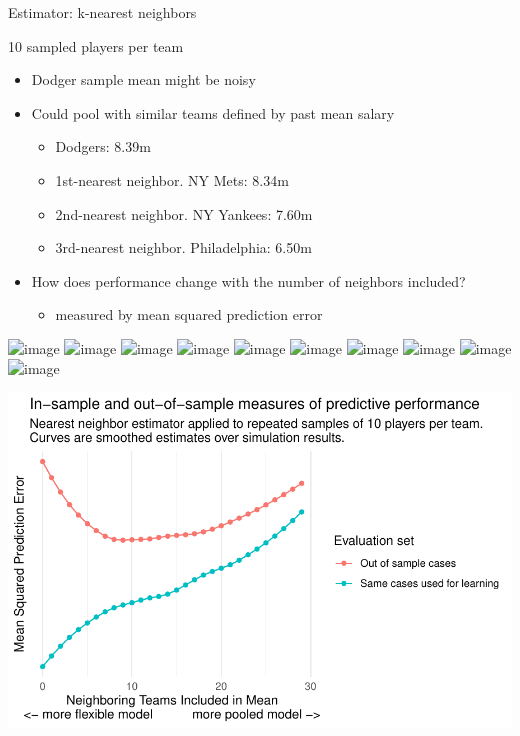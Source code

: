\documentclass{beamer}
\begin{document}
\begin{frame}{Estimator: k-nearest neighbors}

10 sampled players per team
\begin{itemize}
\item Dodger sample mean might be noisy
\item Could pool with similar teams defined by past mean salary
\begin{itemize}
\item Dodgers: 8.39m
\item 1st-nearest neighbor. NY Mets: 8.34m
\item 2nd-nearest neighbor. NY Yankees: 7.60m
\item 3rd-nearest neighbor. Philadelphia: 6.50m
\end{itemize}
\item How does performance change with the number of neighbors included?
\begin{itemize}
\item measured by mean squared prediction error
\end{itemize}
\end{itemize}

\end{frame}

\begin{frame}
\includegraphics<1>[width = \textwidth]{figures/knn_0}
\includegraphics<2>[width = \textwidth]{figures/knn_1}
\includegraphics<3>[width = \textwidth]{figures/knn_2}
\includegraphics<4>[width = \textwidth]{figures/knn_3}
\includegraphics<5>[width = \textwidth]{figures/knn_4}
\includegraphics<6>[width = \textwidth]{figures/knn_5}
\includegraphics<7>[width = \textwidth]{figures/knn_10}
\includegraphics<8>[width = \textwidth]{figures/knn_15}
\includegraphics<9>[width = \textwidth]{figures/knn_20}
\includegraphics<10>[width = \textwidth]{figures/knn_25}
\end{frame}

\begin{frame}
\includegraphics[width = \textwidth]{figures/knn_29}
\end{frame}
\end{document}
